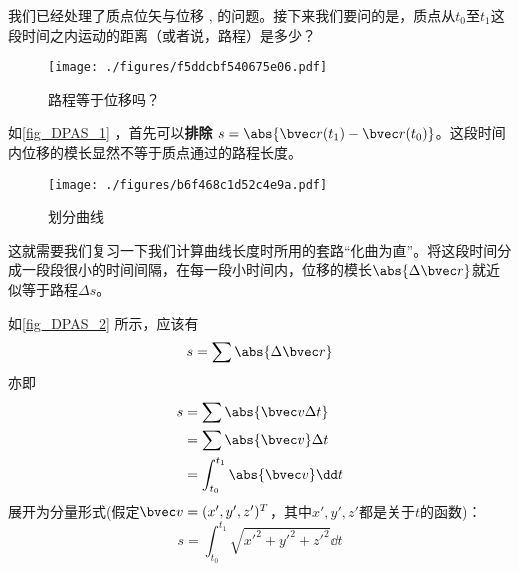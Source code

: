 

我们已经处理了质点位矢与位移 , 的问题。接下来我们要问的是，质点从$t_0$至$t_1$这段时间之内运动的距离（或者说，路程）是多少？

\begin{figure}[ht]
\centering
\texttt{[image: ./figures/f5ddcbf540675e06.pdf]}
\caption{路程等于位移吗？} \label{fig_DPAS_1}
\end{figure}

如\autoref{fig_DPAS_1} ，首先可以\textbf{排除} $s = \abs{\bvec r(t_1) - \bvec r(t_0)}  $。这段时间内位移的模长显然不等于质点通过的路程长度。

\begin{figure}[ht]
\centering
\texttt{[image: ./figures/b6f468c1d52c4e9a.pdf]}
\caption{划分曲线} \label{fig_DPAS_2}
\end{figure}

这就需要我们复习一下我们计算曲线长度时所用的套路“化曲为直”。将这段时间分成一段段很小的时间间隔，在每一段小时间内，位移的模长$\abs{\Delta \bvec r}$就近似等于路程$\Delta s$。

如\autoref{fig_DPAS_2} 所示，应该有 $$s=\sum \abs{\Delta \bvec r}$$
亦即$$
\begin{aligned}
s&=\sum \abs{\bvec v \Delta t}\\
&=\sum \abs{\bvec v} \Delta t\\
&=\int _{t_0}^{t_1} \abs{\bvec v} \dd t\\
\end{aligned}
$$
展开为分量形式(假定$\bvec v = (x',y',z')^T$，其中$x',y',z'$都是关于$t$的函数)：
$$
s = \int _{t_0}^{t_1} \sqrt{x'^2+y'^2+z'^2} \dd t
$$
